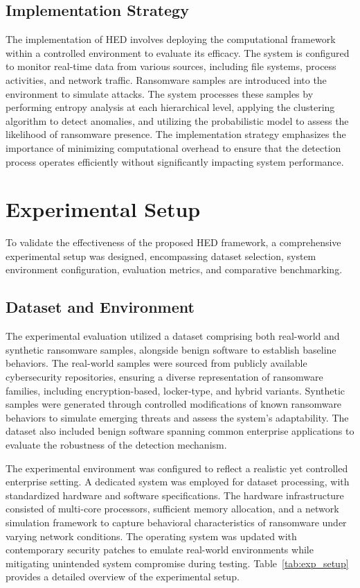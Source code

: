 \documentclass[lettersize,journal]{IEEEtran}
\begin{document}
\subsection{Implementation Strategy}

The implementation of HED involves deploying the computational framework within a controlled environment to evaluate its efficacy. The system is configured to monitor real-time data from various sources, including file systems, process activities, and network traffic. Ransomware samples are introduced into the environment to simulate attacks. The system processes these samples by performing entropy analysis at each hierarchical level, applying the clustering algorithm to detect anomalies, and utilizing the probabilistic model to assess the likelihood of ransomware presence. The implementation strategy emphasizes the importance of minimizing computational overhead to ensure that the detection process operates efficiently without significantly impacting system performance.

\section{Experimental Setup}

To validate the effectiveness of the proposed HED framework, a comprehensive experimental setup was designed, encompassing dataset selection, system environment configuration, evaluation metrics, and comparative benchmarking.

\subsection{Dataset and Environment}

The experimental evaluation utilized a dataset comprising both real-world and synthetic ransomware samples, alongside benign software to establish baseline behaviors. The real-world samples were sourced from publicly available cybersecurity repositories, ensuring a diverse representation of ransomware families, including encryption-based, locker-type, and hybrid variants. Synthetic samples were generated through controlled modifications of known ransomware behaviors to simulate emerging threats and assess the system's adaptability. The dataset also included benign software spanning common enterprise applications to evaluate the robustness of the detection mechanism.

The experimental environment was configured to reflect a realistic yet controlled enterprise setting. A dedicated system was employed for dataset processing, with standardized hardware and software specifications. The hardware infrastructure consisted of multi-core processors, sufficient memory allocation, and a network simulation framework to capture behavioral characteristics of ransomware under varying network conditions. The operating system was updated with contemporary security patches to emulate real-world environments while mitigating unintended system compromise during testing. Table~\ref{tab:exp_setup} provides a detailed overview of the experimental setup.
\end{document}
